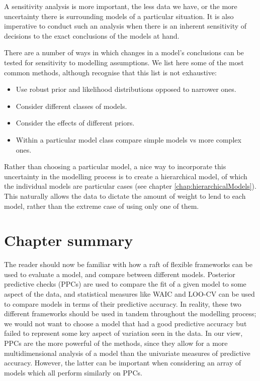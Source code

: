 \documentclass[11pt,fullpage]{book}
\begin{document}
A sensitivity analysis is more important, the less data we have, or the more uncertainty there is surrounding models of a particular situation. It is also imperative to conduct such an analysis when there is an inherent sensitivity of decisions to the exact conclusions of the models at hand.

There are a number of ways in which changes in a model's conclusions can be tested for sensitivity to modelling assumptions. We list here some of the most common methods, although recognise that this list is not exhaustive:

\begin{itemize}
\item Use robust prior and likelihood distributions opposed to narrower ones.
\item Consider different classes of models.
\item Consider the effects of different priors.
\item Within a particular model class compare simple models vs more complex ones.
\end{itemize}

Rather than choosing a particular model, a nice way to incorporate this uncertainty in the modelling process is to create a hierarchical model, of which the individual models are particular cases (see chapter \ref{chap:hierarchicalModels}). This naturally allows the data to dictate the amount of weight to lend to each model, rather than the extreme case of using only one of them.

\section{Chapter summary}
The reader should now be familiar with how a raft of flexible frameworks can be used to evaluate a model, and compare between different models. Posterior predictive checks (PPCs) are used to compare the fit of a given model to some aspect of the data, and statistical measures like WAIC and LOO-CV can be used to compare models in terms of their predictive accuracy. In reality, these two different frameworks should be used in tandem throughout the modelling process; we would not want to choose a model that had a good predictive accuracy but failed to represent some key aspect of variation seen in the data. In our view, PPCs are the more powerful of the methods, since they allow for a more multidimensional analysis of a model than the univariate measures of predictive accuracy. However, the latter can be important when considering an array of models which all perform similarly on PPCs. 
\end{document}
